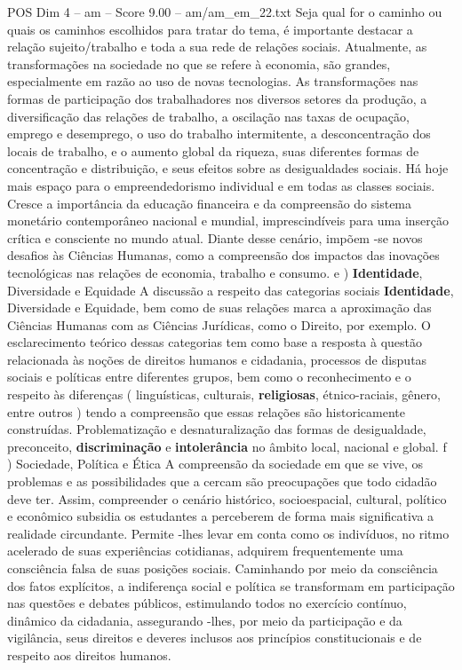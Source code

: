 \begin{textsample}{POS Dim 4 – am – Score 9.00 – am/am\_em\_22.txt}
Seja qual for o caminho ou quais os caminhos escolhidos para tratar do tema, é importante destacar a relação sujeito/trabalho e toda a sua rede de relações sociais.
Atualmente, as transformações na sociedade no que se refere à economia, são grandes, especialmente em razão ao uso de novas tecnologias.
As transformações nas formas de participação dos trabalhadores nos diversos setores da produção, a diversificação das relações de trabalho, a oscilação nas taxas de ocupação, emprego e desemprego, o uso do trabalho intermitente, a desconcentração dos locais de trabalho, e o aumento global da riqueza, suas diferentes formas de concentração e distribuição, e seus efeitos sobre as desigualdades sociais.
Há hoje mais espaço para o empreendedorismo individual e em todas as classes sociais.
Cresce a importância da educação financeira e da compreensão do sistema monetário contemporâneo nacional e mundial, imprescindíveis para uma inserção crítica e consciente no mundo atual.
Diante desse cenário, impõem -se novos desafios às Ciências Humanas, como a compreensão dos impactos das inovações tecnológicas nas relações de economia, trabalho e consumo. e ) \textbf{Identidade}, Diversidade e Equidade A discussão a respeito das categorias sociais \textbf{Identidade}, Diversidade e Equidade, bem como de suas relações marca a aproximação das Ciências Humanas com as Ciências Jurídicas, como o Direito, por exemplo.
O esclarecimento teórico dessas categorias tem como base a resposta à questão relacionada às noções de direitos humanos e cidadania, processos de disputas sociais e políticas entre diferentes grupos, bem como o reconhecimento e o respeito às diferenças ( linguísticas, culturais, \textbf{religiosas}, étnico-raciais, gênero, entre outros ) tendo a compreensão que essas relações são historicamente construídas.
Problematização e desnaturalização das formas de desigualdade, preconceito, \textbf{discriminação} e \textbf{intolerância} no âmbito local, nacional e global. f ) Sociedade, Política e Ética A compreensão da sociedade em que se vive, os problemas e as possibilidades que a cercam são preocupações que todo cidadão deve ter.
Assim, compreender o cenário histórico, socioespacial, cultural, político e econômico subsidia os estudantes a perceberem de forma mais significativa a realidade circundante.
Permite -lhes levar em conta como os indivíduos, no ritmo acelerado de suas experiências cotidianas, adquirem frequentemente uma consciência falsa de suas posições sociais.
Caminhando por meio da consciência dos fatos explícitos, a indiferença social e política se transformam em participação nas questões e debates públicos, estimulando todos no exercício contínuo, dinâmico da cidadania, assegurando -lhes, por meio da participação e da vigilância, seus direitos e deveres inclusos aos princípios constitucionais e de respeito aos direitos humanos.

\end{textsample}

